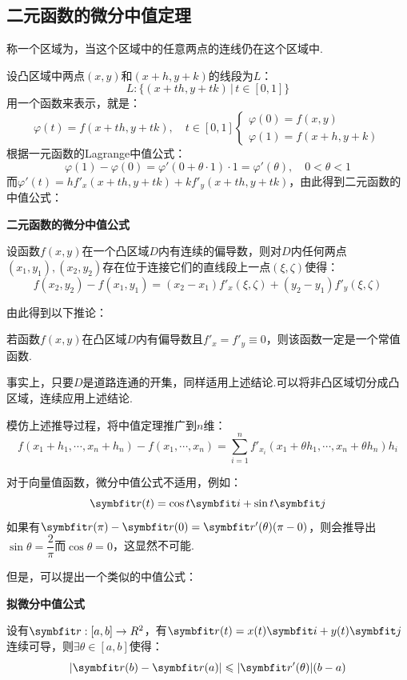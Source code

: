 \subsection{二元函数的微分中值定理}
\begin{definition}
    称一个区域为，当这个区域中的任意两点的连线仍在这个区域中.
\end{definition}
设凸区域中两点$(x,y)$和$(x+h,y+k)$的线段为$L$：
\[L: \{(x+th,y+tk)\,|\,t\in[0,1]\}\]
用一个函数来表示，就是：
\[\varphi(t) = f(x+th,y+tk),\quad t\in[0,1] \begin{cases}
    \varphi(0) = f(x,y) \\
    \varphi(1) = f(x+h,y+k)
\end{cases}\]
根据一元函数的Lagrange中值公式：
\[\varphi(1) - \varphi(0) = \varphi'(0 + \theta\cdot 1)\cdot 1 = \varphi'(\theta),\quad 0<\theta<1\]
而$\varphi'(t) = hf'_x(x+th,y+tk) + kf'_y(x+th,y+tk)$，由此得到二元函数的中值公式：
\begin{theorem}
    \textbf{二元函数的微分中值公式}

    设函数$f(x,y)$在一个凸区域$D$内有连续的偏导数，则对$D$内任何两点$(x_1,y_1),(x_2,y_2)$存在位于连接它们的直线段上一点$(\xi,\zeta)$使得：
    \[f(x_2,y_2) - f(x_1,y_1) = (x_2-x_1)f'_x(\xi,\zeta) + (y_2-y_1)f'_y(\xi,\zeta)\]
\end{theorem}

由此得到以下推论：
\begin{theorem}
    若函数$f(x,y)$在凸区域$D$内有偏导数且$f'_x = f'_y \equiv 0$，则该函数一定是一个常值函数.

    事实上，只要$D$是道路连通的开集，同样适用上述结论.可以将非凸区域切分成凸区域，连续应用上述结论.
\end{theorem}

模仿上述推导过程，将中值定理推广到$n$维：
\[f(x_1+h_1,\cdots,x_n+h_n) - f(x_1,\cdots,x_n) = \sum_{i=1}^{n}f'_{x_i}(x_1+\theta h_1,\cdots,x_n+\theta h_n)h_i\]

对于向量值函数，微分中值公式不适用，例如：
\[\vb{r}(t) = \cos t\vb{i} + \sin t\vb{j}\]
如果有$\vb{r}(\pi)-\vb{r}(0) = \vb{r}'(\theta)(\pi - 0)$，则会推导出$\sin\theta=\dfrac{2}{\pi}$而$\cos\theta = 0$，这显然不可能.

但是，可以提出一个类似的中值公式：
\begin{theorem}
    \textbf{拟微分中值公式}

    设有$\vb{r}:[a,b]\to\mathbb{R}^2$，有$\vb{r}(t) = x(t)\vb{i} + y(t)\vb{j}$连续可导，则$\exists\theta\in[a,b]$使得：
    \[|\vb{r}(b) - \vb{r}(a)| \leqslant |\vb{r}'(\theta)|(b-a)\]
\end{theorem}

